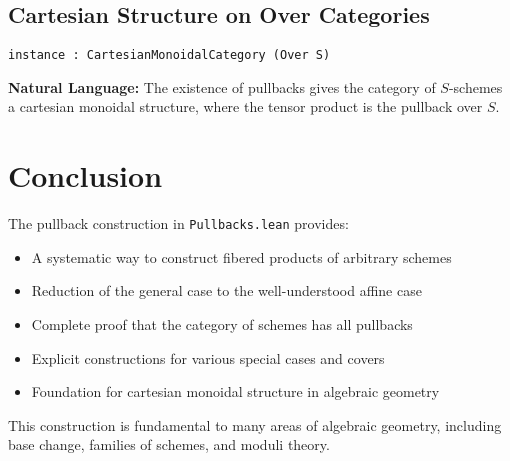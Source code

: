 \documentclass{article}
\theoremstyle{definition}
\begin{document}
\subsection{Cartesian Structure on Over Categories}

\begin{lstlisting}
instance : CartesianMonoidalCategory (Over S)
\end{lstlisting}

\textbf{Natural Language:} The existence of pullbacks gives the category of $S$-schemes a cartesian monoidal structure, where the tensor product is the pullback over $S$.

\section{Conclusion}

The pullback construction in \texttt{Pullbacks.lean} provides:
\begin{itemize}
\item A systematic way to construct fibered products of arbitrary schemes
\item Reduction of the general case to the well-understood affine case
\item Complete proof that the category of schemes has all pullbacks
\item Explicit constructions for various special cases and covers
\item Foundation for cartesian monoidal structure in algebraic geometry
\end{itemize}

This construction is fundamental to many areas of algebraic geometry, including base change, families of schemes, and moduli theory.
\end{document}
